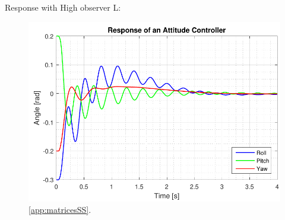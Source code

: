 Response with High observer L:

\begin{figure}[H]
	\centering
	\includegraphics[scale=0.8]{figures/ssEqObsHigh.pdf}
	\caption{\autoref{app:matricesSS}.}
	\label{fig:TranslationalControlDiagram}
\end{figure}
